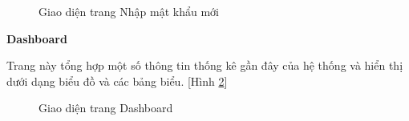 \begin{figure}[H]
    \begin{center}
        \caption{Giao diện trang Nhập mật khẩu mới}
        \label{result_quen_mat_khau_new_password}
    \end{center}
\end{figure}


\textbf{Dashboard}

Trang này tổng hợp một số thông tin thống kê gần đây của hệ thống và hiển thị dưới dạng biểu đồ và các bảng biểu. [Hình \ref{result_dashboard}]

\begin{figure}[H]
    \begin{center}
        \caption{Giao diện trang Dashboard}
        \label{result_dashboard}
    \end{center}
\end{figure}

